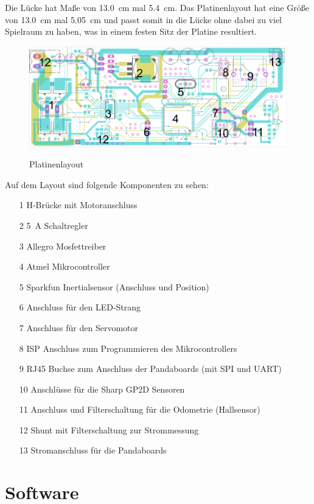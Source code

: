 Die Lücke hat Maße von \SI{13,0}{\cm} mal \SI{5,4}{\cm}. Das Platinenlayout hat eine Größe von  \SI{13,0}{\cm} mal \SI{5,05}{\cm} und passt somit in die Lücke ohne dabei zu viel Spielraum zu haben, 
was in einem festen Sitz der Platine resultiert. 

\begin{figure}[H]
\centering
\includegraphics[width=.8\textwidth]{platinen_layout_scr.png}\\
\caption{Platinenlayout}%
\label{fig:layout}
\end{figure}


Auf dem Layout sind folgende Komponenten zu sehen:
\begin{itemize}
\setlength{\parskip}{0pt}
 \item [1] H-Brücke mit Motoranschluss
 \item [2] \SI{5}{\A} Schaltregler
 \item [3] Allegro Mosfettreiber
 \item [4] Atmel Mikrocontroller
 \item [5] Sparkfun Inertialsensor (Anschluss und Position)
 \item [6] Anschluss für den LED-Strang
 \item [7] Anschluss für den Servomotor
 \item [8] ISP Anschluss zum Programmieren des Mikrocontrollers
 \item [9] RJ45 Buchse zum Anschluss der Pandaboards (mit SPI und U\-ART)
 \item [10] Anschlüsse für die Sharp GP2D Sensoren 
 \item [11] Anschluss und Filterschaltung für die Odometrie (Hallsensor)
 \item [12] Shunt mit Filterschaltung zur Strommessung
 \item [13] Stromanschluss für die Pandaboards
\end{itemize}



\section{Software}

